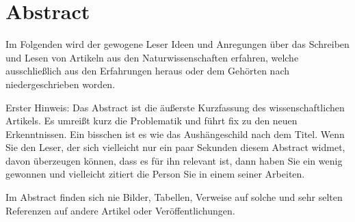 \section*{Abstract}
Im Folgenden wird der gewogene Leser Ideen und 
Anregungen über das Schreiben und Lesen von Artikeln aus den 
Naturwissenschaften erfahren, welche ausschließlich aus den 
Erfahrungen heraus oder dem Gehörten nach 
niedergeschrieben worden.

Erster Hinweis: Das Abstract ist die äußerste Kurzfassung 
des wissenschaftlichen Artikels. Es umreißt kurz die Problematik 
und führt fix zu den neuen Erkenntnissen. Ein bisschen ist 
es wie das Aushängeschild nach dem Titel. Wenn Sie den Leser, 
der sich vielleicht nur ein paar Sekunden diesem Abstract widmet, 
davon überzeugen können, dass es für ihn relevant ist, 
dann haben Sie ein wenig gewonnen und vielleicht zitiert 
die Person Sie in einem seiner Arbeiten.

Im Abstract finden sich nie Bilder, Tabellen, 
Verweise auf solche und sehr selten Referenzen auf andere
Artikel oder Veröffentlichungen. 